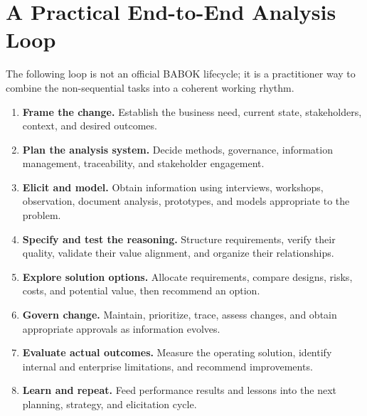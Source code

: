 \documentclass[11pt]{article}
\begin{document}
\section{A Practical End-to-End Analysis Loop}
The following loop is not an official BABOK lifecycle; it is a practitioner way to combine the non-sequential tasks into a coherent working rhythm.

\begin{enumerate}
\item \textbf{Frame the change.} Establish the business need, current state, stakeholders, context, and desired outcomes.
\item \textbf{Plan the analysis system.} Decide methods, governance, information management, traceability, and stakeholder engagement.
\item \textbf{Elicit and model.} Obtain information using interviews, workshops, observation, document analysis, prototypes, and models appropriate to the problem.
\item \textbf{Specify and test the reasoning.} Structure requirements, verify their quality, validate their value alignment, and organize their relationships.
\item \textbf{Explore solution options.} Allocate requirements, compare designs, risks, costs, and potential value, then recommend an option.
\item \textbf{Govern change.} Maintain, prioritize, trace, assess changes, and obtain appropriate approvals as information evolves.
\item \textbf{Evaluate actual outcomes.} Measure the operating solution, identify internal and enterprise limitations, and recommend improvements.
\item \textbf{Learn and repeat.} Feed performance results and lessons into the next planning, strategy, and elicitation cycle.
\end{enumerate}
\end{document}
